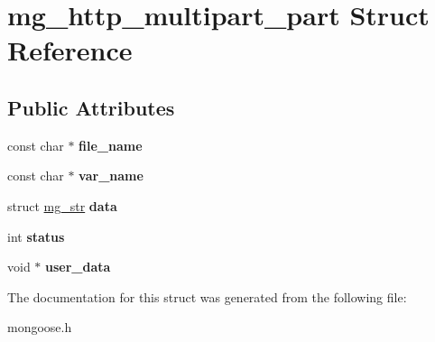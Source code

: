 \hypertarget{structmg__http__multipart__part}{}\section{mg\+\_\+http\+\_\+multipart\+\_\+part Struct Reference}
\label{structmg__http__multipart__part}
\subsection*{Public Attributes}
\begin{DoxyCompactItemize}
\item 
\mbox{\label{structmg__http__multipart__part_a838efa2eb99ad6cecd6ae714d4775091}} 
const char $\ast$ {\bfseries file\+\_\+name}
\item 
\mbox{\label{structmg__http__multipart__part_af3c6e9825e31f000ec9e26c016eaa707}} 
const char $\ast$ {\bfseries var\+\_\+name}
\item 
\mbox{\label{structmg__http__multipart__part_a803db4feee24a462665d487acbeb1953}} 
struct \hyperlink{structmg__str}{mg\+\_\+str} {\bfseries data}
\item 
\mbox{\label{structmg__http__multipart__part_a728d1246c153ef43fb1f821bee61925a}} 
int {\bfseries status}
\item 
\mbox{\label{structmg__http__multipart__part_ab0c10748e6a40d9c85b4ec0ac98047bd}} 
void $\ast$ {\bfseries user\+\_\+data}
\end{DoxyCompactItemize}


The documentation for this struct was generated from the following file\+:\begin{DoxyCompactItemize}
\item 
mongoose.\+h\end{DoxyCompactItemize}
